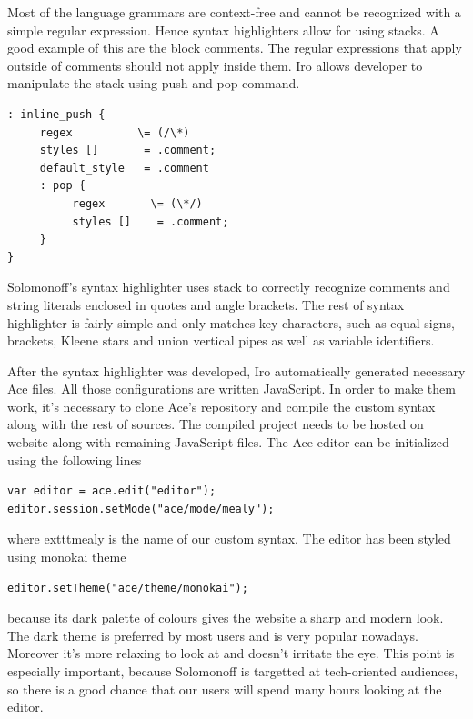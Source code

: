 Most of the language grammars are context-free and cannot be recognized with a simple regular expression. Hence syntax highlighters allow for using stacks. A good example of this are the block comments. The regular expressions that apply outside of comments should not apply inside them. Iro allows developer to manipulate the stack using push and pop command.
\begin{lstlisting}
: inline_push {
     regex          \= (/\*)
     styles []       = .comment;
     default_style   = .comment
     : pop {
          regex       \= (\*/)
          styles []    = .comment;
     }
}
\end{lstlisting}
Solomonoff's syntax highlighter uses stack to correctly recognize comments and string literals enclosed in quotes and angle brackets. The rest of syntax highlighter is fairly simple and only matches key characters, such as equal signs, brackets, Kleene stars and union vertical pipes as well as variable identifiers.

After the syntax highlighter was developed, Iro automatically generated necessary Ace files. All those configurations are written JavaScript. In order to make them work, it's necessary to clone Ace's repository and compile the custom syntax along with the rest of sources. The compiled project needs to be hosted on website along with remaining JavaScript files. The Ace editor can be initialized using the following lines
\begin{lstlisting}
var editor = ace.edit("editor");
editor.session.setMode("ace/mode/mealy");
\end{lstlisting}
where     exttt{mealy} is the name of our custom syntax.
The editor has been styled using monokai theme
\begin{lstlisting}
editor.setTheme("ace/theme/monokai");
\end{lstlisting}
because its dark palette of colours gives the website a sharp and modern look. The dark theme is preferred by most users and is very popular nowadays. Moreover it's more relaxing to look at and doesn't irritate the eye. This point is especially important, because Solomonoff is targetted at tech-oriented audiences, so there is a good chance that our users will spend many hours looking at the editor. 

